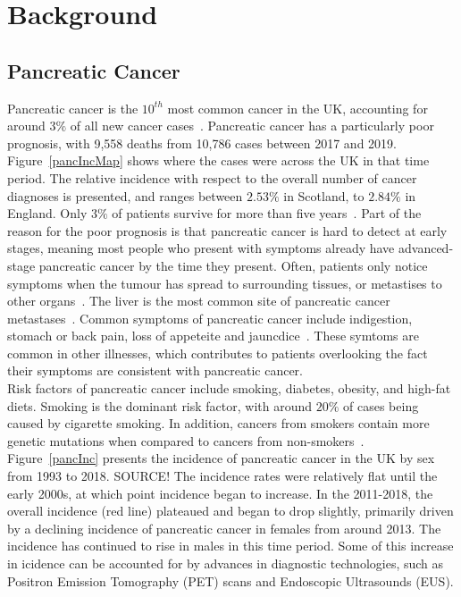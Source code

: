 \chapter{Background}

\section{Pancreatic Cancer}
Pancreatic cancer is the $10^{th}$ most common cancer in the UK, accounting for around $3\%$ of all new cancer cases~\cite{pancStat}. Pancreatic cancer has a particularly poor prognosis, with 9,558 deaths from 10,786 cases between 2017 and 2019. Figure~\ref{pancIncMap} shows where the cases were across the UK in that time period. The relative incidence with respect to the overall number of cancer diagnoses is presented, and ranges between $2.53\%$ in Scotland, to $2.84\%$ in England. Only $3\%$ of patients survive for more than five years~\cite{NG85}. Part of the reason for the poor prognosis is that pancreatic cancer is hard to detect at early stages, meaning most people who present with symptoms already have advanced-stage pancreatic cancer by the time they present. Often, patients only notice symptoms when the tumour has spread to surrounding tissues, or metastises to other organs~\cite{kelsen}. The liver is the most common site of pancreatic cancer metastases~\cite{deeb}. Common symptoms of pancreatic cancer include indigestion, stomach or back pain, loss of appeteite and jauncdice~\cite{pancSymp}. These symtoms are common in other illnesses, which contributes to patients overlooking the fact their symptoms are consistent with pancreatic cancer. \\

Risk factors of pancreatic cancer include smoking, diabetes, obesity, and high-fat diets. Smoking is the dominant risk factor, with around $20\%$ of cases being caused by cigarette smoking. In addition, cancers from smokers contain more genetic mutations when compared to cancers from non-smokers~\cite{blackford}. \\

Figure~\ref{pancInc} presents the incidence of pancreatic cancer in the UK by sex from 1993 to 2018. SOURCE! The incidence rates were relatively flat until the early 2000s, at which point incidence began to increase. In the 2011-2018, the overall incidence (red line) plateaued and began to drop slightly, primarily driven by a declining incidence of pancreatic cancer in females from around 2013. The incidence has continued to rise in males in this time period. Some of this increase in icidence can be accounted for by advances in diagnostic technologies, such as Positron Emission Tomography (PET) scans and Endoscopic Ultrasounds (EUS). \\

